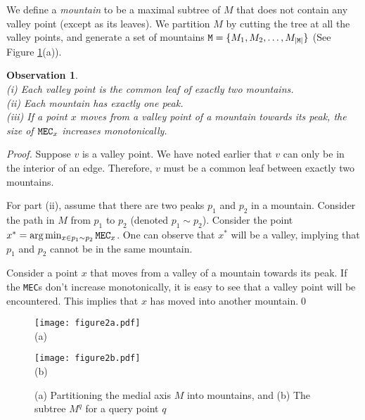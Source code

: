 \documentclass[12pt]{llncs}
\newtheorem{observation}{Observation}
\begin{document}
We define a {\em mountain} to be a maximal subtree of 
$M$ that does not contain any valley point (except as its leaves). 
We partition $M$ by cutting the tree at all the valley 
points, and generate a set of mountains ${\tt M} = \{M_1,M_2,\ldots,M_{|{\tt M}|}\}$ 
(See Figure \ref{fig:MedialAxisPartitioning}(a)). 
\begin{observation} \label{o} ~\\
(i) Each valley point is the common leaf of exactly two mountains.\\
(ii) Each mountain has exactly one peak.\\
(iii) If a point $x$ moves from a valley point of a 
mountain towards its peak, the size of ${\tt MEC}_x$ increases monotonically.  
\end{observation}
\begin{proof}
Suppose $v$ is a valley point. We have noted earlier that $v$ can only be in 
the interior of an edge. Therefore, $v$ must be a common leaf between exactly two mountains.

For part (ii), assume that there are two peaks $p_1$ and $p_2$ in a mountain. Consider the path in $M$ from $p_1$ to $p_2$ (denoted $p_1 \sim p_2$). Consider the point $x^* = \arg \min_{x \in p_1 \sim p_2} {\tt MEC}_x$.  One can observe that $x^*$ will be a valley, implying that $p_1$ and $p_2$ cannot be in the same mountain.

 Consider a point $x$ that moves from a valley  of a 
mountain towards its peak. If the {\tt MEC}s don't increase monotonically, 
it is easy to see that a valley point will be encountered. This
implies that $x$ has moved into another mountain.\qed
\end{proof}
\begin{figure}[h]
\begin{minipage}[c]{0.5\textwidth}
\begin{center} \texttt{[image: figure2a.pdf]}\\
(a)  
\end{center}
\end{minipage}\begin{minipage}[c]{0.5\textwidth}
\begin{center} \texttt{[image: figure2b.pdf]}\\
(b)  
\end{center}
\end{minipage}
\caption{(a) Partitioning the medial axis 
$M$ into mountains, and (b) The subtree $M^q$ for a query point $q$}
\label{fig:MedialAxisPartitioning}
\end{figure}
\end{document}
